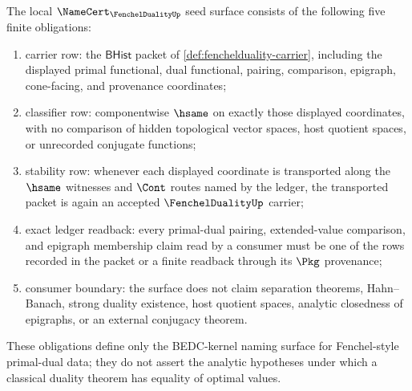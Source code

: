 \begin{theorem}
\label{thm:fenchelduality-namecert-obligation-surface}
The local $\NameCert_{\FenchelDualityUp}$ seed surface consists of the following five finite obligations:
\begin{enumerate}
\item carrier row: the $\mathsf{BHist}$ packet of \autoref{def:fenchelduality-carrier}, including the displayed primal functional, dual functional, pairing, comparison, epigraph, cone-facing, and provenance coordinates;
\item classifier row: componentwise $\hsame$ on exactly those displayed coordinates, with no comparison of hidden topological vector spaces, host quotient spaces, or unrecorded conjugate functions;
\item stability row: whenever each displayed coordinate is transported along the $\hsame$ witnesses and $\Cont$ routes named by the ledger, the transported packet is again an accepted $\FenchelDualityUp$ carrier;
\item exact ledger readback: every primal-dual pairing, extended-value comparison, and epigraph membership claim read by a consumer must be one of the rows recorded in the packet or a finite readback through its $\Pkg$ provenance;
\item consumer boundary: the surface does not claim separation theorems, Hahn--Banach, strong duality existence, host quotient spaces, analytic closedness of epigraphs, or an external conjugacy theorem.
\end{enumerate}
These obligations define only the BEDC-kernel naming surface for Fenchel-style primal-dual data; they do not assert the analytic hypotheses under which a classical duality theorem has equality of optimal values.
\end{theorem}
